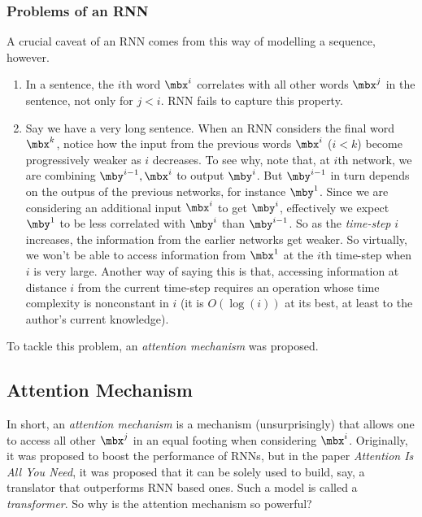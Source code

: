 \documentclass[11pt]{article}
\begin{document}
    \subsubsection{Problems of an RNN}
    
    A crucial caveat of an RNN comes from this way of modelling a sequence, however.
    \begin{enumerate}
        \item In a sentence, the $i$th word $\mbx^i$ correlates with all other words $\mbx^j$ in the sentence, not only for $j<i$. RNN fails to capture this property.
        \item Say we have a very long sentence. When an RNN considers the final word $\mbx^k$, notice how the input from the previous words $\mbx^i$ ($i<k$) become progressively weaker as $i$ decreases. To see why, note that, at $i$th network, we are combining $\mby^{i-1},\mbx^i$ to output $\mby^i$. But $\mby^{i-1}$ in turn depends on the outpus of the previous networks, for instance $\mby^1$. Since we are considering an additional input $\mbx^i$ to get $\mby^i$, effectively we expect $\mby^1$ to be less correlated with $\mby^i$ than $\mby^{i-1}$. So as the \textit{time-step} $i$ increases, the information from the earlier networks get weaker. So virtually, we won't be able to access information from $\mbx^1$ at the $i$th time-step when $i$ is very large. Another way of saying this is that, accessing information at distance $i$ from the current time-step requires an operation whose time complexity is nonconstant in $i$ (it is $O\left( \log\left( i \right) \right)$ at its best, at least to the author's current knowledge).
    \end{enumerate}
    To tackle this problem, an \textit{attention mechanism} was proposed.    

    \subsection{Attention Mechanism}

    In short, an \textit{attention mechanism} is a mechanism (unsurprisingly) that allows one to access all other $\mbx^j$ in an equal footing when considering $\mbx^i$. Originally, it was proposed to boost the performance of RNNs, but in the paper \textit{Attention Is All You Need}, it was proposed that it can be solely used to build, say, a translator that outperforms RNN based ones. Such a model is called a \textit{transformer}. So why is the attention mechanism so powerful?
    
    
    
    
    
    
    
    
    
    
    
    
    
    
    
    
    
    
    
    
    
    
    
    
    
    
    
    
    
    
    
    
    
    
    
\end{document}

